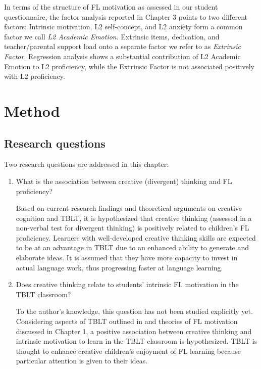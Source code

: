 \documentclass[output=paper]{langsci/langscibook}
\begin{document}
In terms of the structure of FL motivation as assessed in our student questionnaire, the factor analysis reported in Chapter 3 points to two different factors: Intrinsic motivation, L2 self-concept, and L2 anxiety form a common factor we call \textit{L2 Academic Emotion}. Extrinsic items, dedication, and teacher/parental support load onto a separate factor we refer to as \textit{Extrinsic Factor}. Regression analysis shows a substantial contribution of L2 Academic Emotion to L2 proficiency, while the Extrinsic Factor is not associated positively with L2 proficiency.

\section{Method}
\subsection{Research questions}

Two research questions are addressed in this chapter:

\begin{enumerate} 

\item What is the association between creative (divergent) thinking and FL proficiency? 

Based on current research findings and theoretical arguments on creative cognition and TBLT, it is hypothesized that creative thinking (assessed in a non-verbal test for divergent thinking) is positively related to children’s FL proficiency. Learners with well-developed creative thinking skills are expected to be at an advantage in TBLT due to an enhanced ability to generate and elaborate ideas. It is assumed that they have more capacity to invest in actual language work, thus progressing faster at language learning.

\item Does creative thinking relate to students’ intrinsic FL motivation in the TBLT classroom? 

To the author’s knowledge, this question has not been studied explicitly yet. Considering aspects of TBLT outlined in  and theories of FL motivation discussed in Chapter 1, a positive association between creative thinking and intrinsic motivation to learn in the TBLT classroom is hypothesized. TBLT is thought to enhance creative children’s enjoyment of FL learning because particular attention is given to their ideas. 
\end{enumerate}
\end{document}
